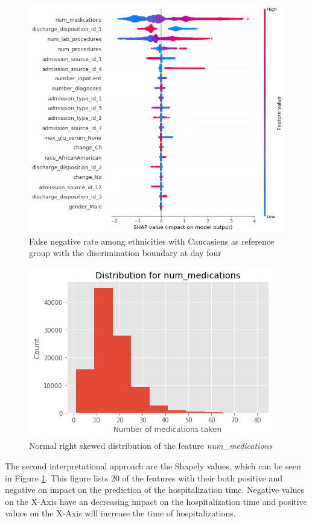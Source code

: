 \documentclass[journal]{IEEEtran}
\begin{document}
\begin{figure}
	\centering
	\includegraphics[width=1\linewidth]{../imgs/shap_paper}
	\caption{False negative rate among ethnicities with Caucasiens as reference group with the discrimination boundary at day four}
	\label{fig:shap}
\end{figure}

\begin{figure}
	\centering
	\includegraphics[width=0.9\linewidth]{../imgs/meds_dist}
	\caption{Normal right skewed distribution of the feature \textit{num\_medications}}
	\label{fig:num_meds}
\end{figure}

The second interpretational approach are the Shapely values, which can be seen in Figure \ref{fig:shap}. This figure lists 20 of the features with their both positive and negative on impact on the prediction of the hospitalization time. Negative values on the X-Axis have an decreasing impact on the hospitalization time and positive values on the X-Axis will increase the time of hospitalizations.
\end{document}
